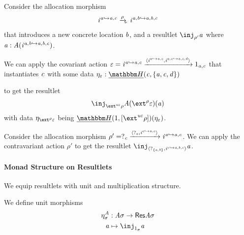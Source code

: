 \begin{example}
    Consider the allocation morphism
    \[ \incl^{\va \inclto \va,\vc} \xato\rho \incl^{\va,\vb \inclto \va,\vb,\vc} \] 
    that introduces a new concrete location $\mathit{b}$,
    and a resultlet $\inj_{\rho'}\va$ where $\mathit{a} : \mathit{A}(\mathit{i}^{\mathit{a},\mathit{b} \hookrightarrow \mathit{a},\mathit{b},\mathit{c}})$.

    We can apply the covariant action $\varepsilon = \mathit{i}^{\mathit{a} \hookrightarrow \mathit{a},\mathit{c}} \xrightarrow{\langle\mathit{i}^{\mathit{a} \hookrightarrow \mathit{a},\mathit{c}}, \mathit{i}^{\mathit{a},\mathit{c} \hookrightarrow \mathit{a},\mathit{c},\mathit{d}}\rangle} 1_{\mathit{a},\mathit{c}}$ that instantiates $\mathit{c}$ with some data $\mvarM_\me : \dheapF(\vc, \{\va,\vc,\vd\})$

    \begin{center}
    \end{center}
    to get the resultlet 
        \[ \inj_{\ext^{\tinstU\me}\rho} \vA(\ext^\rho\me)(\va) \]
            with data $\mvarM_{\ext^{\rho}{\me}}$ being $\dheapF(1, \anyL{\ext^{\tinstU\me}\rho})(\mvarM_\me)$.

    Consider the allocation morphism $\rho' = ?_{\mathit{c}} \xrightarrow{\langle?_{\mathit{a}}, \mathit{i}^{\mathit{c} \hookrightarrow \mathit{a},\mathit{c}}\rangle} \mathit{i}^{\mathit{a} \hookrightarrow \mathit{a},\mathit{c}}$.
    We can apply the contravariant action $\rho'$ to get the resultlet $\inj_{\pair{?_{\{\va,\vb\}}}{\incl^{\vc \inclto \va,\vb,\vc}}} \va$.
\end{example}

\paragraph{Monad Structure on Resultlets}

We equip resultlets with unit and multiplication structure.

\begin{definition}
    We define unit morphisms
    \begin{align*}
        \eta^\vA_\sigma & : \vA\sigma \to \typeRes\vA\sigma \\
        \va & \mapsto \inj_{1_\sigma} \va
    \end{align*}
\end{definition}

